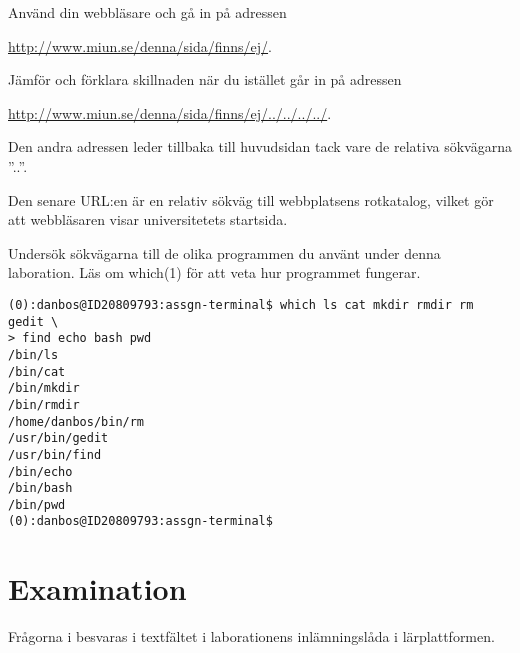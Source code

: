 \documentclass[11pt,a4paper]{miunasgn}
\begin{document}
\begin{questions}
	\question\label{q:RelativeWWW}
	Använd din webbläsare och gå in på adressen
	\begin{center}
		\url{http://www.miun.se/denna/sida/finns/ej/}.
	\end{center}
	Jämför och förklara skillnaden när du istället går in på adressen
	\begin{center}
		\url{http://www.miun.se/denna/sida/finns/ej/../../../../}.
	\end{center}
	\begin{solution}
		Den andra adressen leder tillbaka till huvudsidan tack vare de relativa
		sökvägarna ''..''.
	\end{solution}
	\begin{solution}
		Den senare URL:en är en relativ sökväg till webbplatsens rotkatalog, vilket 
		gör att webbläsaren visar universitetets startsida.
	\end{solution}

	\question\label{q:which}
	Undersök sökvägarna till de olika programmen du använt under denna 
	laboration.
	Läs om which(1) för att veta hur programmet fungerar.
	\begin{solution}
		\begin{lstlisting}
(0):danbos@ID20809793:assgn-terminal$ which ls cat mkdir rmdir rm gedit \
> find echo bash pwd
/bin/ls
/bin/cat
/bin/mkdir
/bin/rmdir
/home/danbos/bin/rm
/usr/bin/gedit
/usr/bin/find
/bin/echo
/bin/bash
/bin/pwd
(0):danbos@ID20809793:assgn-terminal$
		\end{lstlisting}
	\end{solution}

\end{questions}


\section{Examination}
\label{sec:Examination}
\noindent
Frågorna i  besvaras i textfältet i laborationens 
inlämningslåda i lärplattformen.



\end{document}

